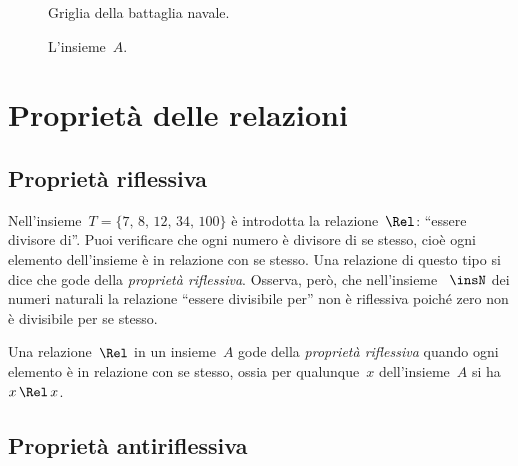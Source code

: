 \ovalbox{\risolvii \ref{ese:B.12}, \ref{ese:B.13}, \ref{ese:B.14}, \ref{ese:B.15}, \ref{ese:B.16}, \ref{ese:B.17}, \ref{ese:B.18}}
\begin{figure}[hb]
\begin{minipage}[t]{.45\textwidth}
 \centering
 
 \caption{Griglia della battaglia navale.}\label{fig:B.1}
\end{minipage}\hfil
\begin{minipage}[t]{.45\textwidth}
 \centering
 
 \caption{L'insieme~$A$.}\label{fig:B.2}
\end{minipage}
\end{figure}

\pagebreak
\section{Proprietà delle relazioni}
\subsection{Proprietà riflessiva}

\begin{exrig}
 \begin{esempio}

Nell'insieme~$T = \{\text{7, 8, 12, 34, 100}\}$ è introdotta la relazione~$\Rel$: ``essere divisore di''.
Puoi verificare che ogni numero è divisore di se stesso, cioè ogni elemento dell'insieme è in relazione
con se stesso. Una relazione di questo tipo si dice che gode della \emph{proprietà riflessiva}.
Osserva, però, che nell'insieme ~$\insN$ dei numeri naturali la relazione ``essere divisibile per'' non è riflessiva poiché zero non è divisibile per se stesso.
 \end{esempio}
\end{exrig}

\begin{definizione}
Una relazione~$\Rel$ in un insieme~$A$ gode della \emph{proprietà riflessiva} quando ogni elemento è in relazione con se stesso, ossia per qualunque~$x$ dell'insieme~$A$ si ha~$x \,\Rel\, x$.
\end{definizione}

\ovalbox{\risolvi \ref{ese:B.19}}

\subsection{Proprietà antiriflessiva}

